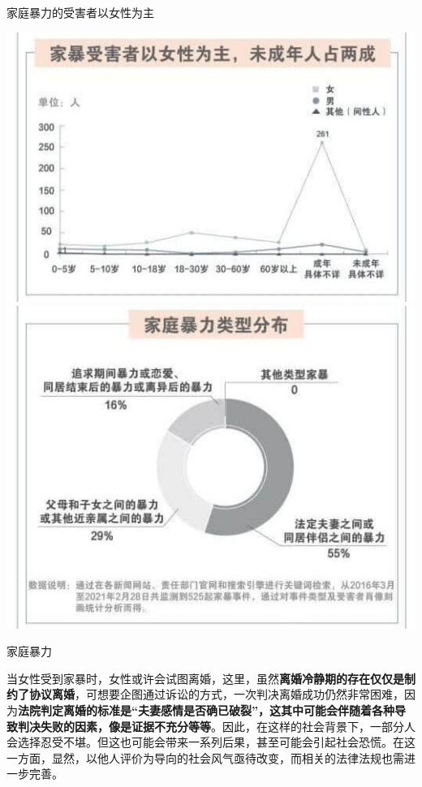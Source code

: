 \begin{frame}{家庭暴力的受害者以女性为主}
    \begin{block}{}
        \includegraphics[height=.5\textheight]{../docs/img/3-11.jpg}
        \hfill
        \includegraphics[height=.5\textheight]{../docs/img/3-12.jpg}
    \end{block}
\end{frame}

\begin{frame}{家庭暴力}
    \begin{block}{}
        当女性受到家暴时，女性或许会试图离婚，这里，虽然\textbf{离婚冷静期的存在仅仅是制约了协议离婚}，可想要企图通过诉讼的方式，一次判决离婚成功仍然非常困难，因为\textbf{法院判定离婚的标准是“夫妻感情是否确已破裂”，这其中可能会伴随着各种导致判决失败的因素，像是证据不充分等等}。因此，在这样的社会背景下，一部分人会选择忍受不堪。但这也可能会带来一系列后果，甚至可能会引起社会恐慌。在这一方面，显然，以他人评价为导向的社会风气亟待改变，而相关的法律法规也需进一步完善。
    \end{block}
\end{frame}

